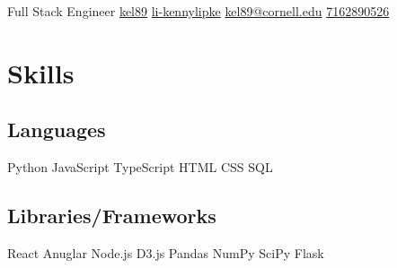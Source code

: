 \documentclass[]{plushcv}
\begin{document}
%
%

    {Full Stack Engineer}
    {
        {\href{https://www.github.com/kel89}{kel89}}
        {\href{https://www.linkedin.com/in/kennylipke}{li-kennylipke}}
        {\href{mailto:kel89@cornell.edu}{kel89@cornell.edu}}
        {\href{tel:+17162890526}{7162890526}}}


%
%

\begin{minipage}[t]{0.25\textwidth} 

    
    \section{Skills}
    \subsection{Languages}
    \sectionsep
    Python \textbullet{} JavaScript \textbullet{} TypeScript \textbullet{} HTML \textbullet{} CSS \textbullet{} SQL 
    
    \sectionsep
    \sectionsep
    \subsection{Libraries/Frameworks}
    \sectionsep
    React \textbullet{} Anuglar \textbullet{} Node.js \textbullet{} D3.js \textbullet{} Pandas 
        \textbullet{} NumPy \textbullet{} SciPy \textbullet{} Flask
    
    \sectionsep
    \sectionsep

\end{minipage}
\end{document}
